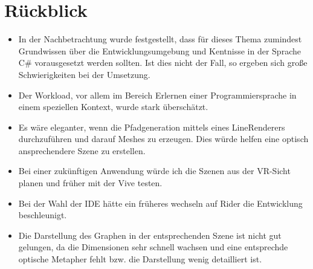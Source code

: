 \section{Rückblick}

\begin{itemize}
	\item In der Nachbetrachtung wurde festgestellt, dass für dieses Thema zumindest Grundwissen über die Entwicklungsumgebung und Kentnisse in der Sprache C\# vorausgesetzt werden sollten. Ist dies nicht der Fall, so ergeben sich große Schwierigkeiten bei der Umsetzung.
	\item Der Workload, vor allem im Bereich \glqq Erlernen einer Programmiersprache in einem speziellen Kontext\grqq{}, wurde stark überschätzt.   
	\item Es wäre eleganter, wenn die Pfadgeneration mittels eines LineRenderers durchzuführen und darauf Meshes zu erzeugen. Dies würde helfen eine optisch ansprechendere Szene zu erstellen.
	\item Bei einer zukünftigen Anwendung würde ich die Szenen aus der VR-Sicht planen und früher mit der Vive testen.
	\item Bei der Wahl der IDE hätte ein früheres wechseln auf Rider die Entwicklung beschleunigt.
	\item Die Darstellung des Graphen in der entsprechenden Szene ist nicht gut gelungen, da die Dimensionen sehr schnell wachsen und eine entsprechde optische Metapher fehlt bzw. die Darstellung wenig detailliert ist. 
\end{itemize}






